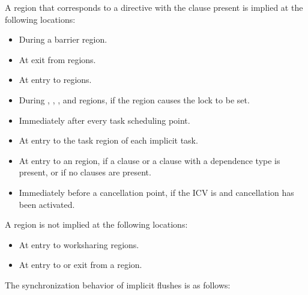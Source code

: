 A  region that corresponds to a  directive with the
 clause present is implied at the following locations:

\begin{itemize}
\item During a barrier region.
\item At exit from  regions.
\item At entry to  regions.
\item During , ,
    , and  regions, if
    the region causes the lock to be set.
\item Immediately after every task scheduling point.
\item At entry to the task region of each implicit task.
\item At entry to an  region, if a
     clause or a  clause with a
     dependence type is present, or if no clauses are present.
\item Immediately before a cancellation point, if the  ICV is
     and cancellation has been activated.
\end{itemize}

\begin{note}
A  region is not implied at the following locations:
\begin{itemize}
\item At entry to worksharing regions.

\item At entry to or exit from a  region.
\end{itemize}
\end{note}

The synchronization behavior of implicit flushes is as follows:

